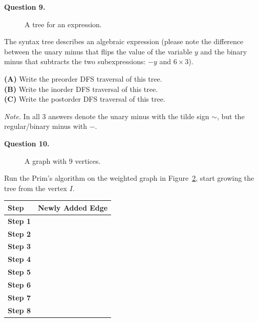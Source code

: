 \documentclass[jou]{apa6}
\begin{document}
\vspace{10pt}
{\bf Question 9.}

\begin{figure}[!htb]
\caption{\label{fig:final-syntax-tree} A tree for an expression.}
\end{figure}

The syntax tree describes an algebraic expression (please note
the difference between the unary minus that
flips the value of the variable $y$ and 
the binary minus that subtracts the 
two subexpressions: $-y$ and $6 \times 3$). 

{\bf (A)} Write the preorder DFS traversal of
this tree.\\
{\bf (B)} Write the inorder DFS traversal of 
this tree.\\
{\bf (C)} Write the postorder DFS traversal of 
this tree.

{\em Note.} In all $3$ answers denote the unary 
minus with the tilde sign $\sim$, 
but the regular/binary minus with $-$. 






\vspace{10pt}
{\bf Question 10.}\\
\begin{figure}[!htb]
\caption{\label{fig:prim-weighted-graph} A graph with 9 vertices.}
\end{figure}

Run the Prim's algorithm on the weighted graph in Figure~\ref{fig:prim-weighted-graph}, 
start growing the tree from the vertex $I$. 

\begin{tabular}{|l|l|} \hline
{\bf Step} & {\bf Newly Added Edge} \\ \hline
{\bf Step 1} & \\ \hline
{\bf Step 2} & \\ \hline
{\bf Step 3} & \\ \hline
{\bf Step 4} & \\ \hline
{\bf Step 5} & \\ \hline
{\bf Step 6} & \\ \hline
{\bf Step 7} & \\ \hline
{\bf Step 8} & \\ \hline
\end{tabular}
\end{document}
